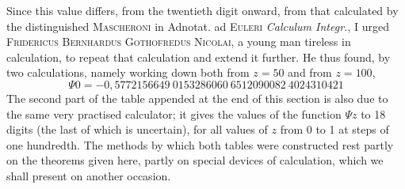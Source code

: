 \expandafter\def\csname HistoricalNoteText18\endcsname{Since this value differs, from the twentieth digit onward, from that calculated by the distinguished \textsc{Mascheroni} in Adnotat. ad \textsc{Euleri} \textit{Calculum Integr.}, I urged \textsc{Fridericus Bernhardus Gothofredus Nicolai}, a young man tireless in calculation, to repeat that calculation and extend it further. He thus found, by two calculations, namely working down both from $z=50$ and from $z=100$,
\[
\Psi0=-0{,}5772156649\ 0153286060\ 6512090082\ 4024310421
\]
The second part of the table appended at the end of this section is also due to the same very practised calculator; it gives the values of the function $\Psi z$ to 18 digits (the last of which is uncertain), for all values of $z$ from 0 to 1 at steps of one hundredth. The methods by which both tables were constructed rest partly on the theorems given here, partly on special devices of calculation, which we shall present on another occasion.}
